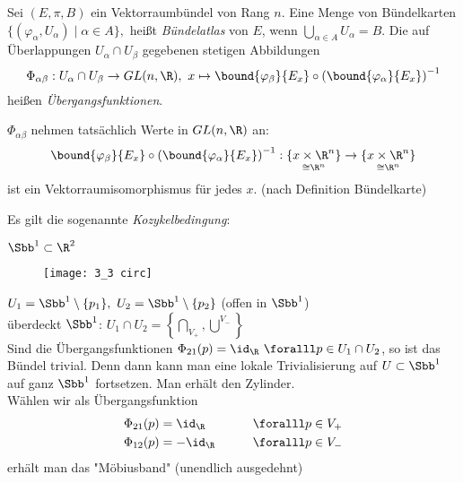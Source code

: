 \begin{defn} 
	Sei $ (E,\pi,B) $ ein Vektorraumbündel von Rang $n$. Eine Menge von Bündelkarten $ \{(\varphi_\alpha, U_\alpha) \mid \alpha \in A\}, $ heißt \emph{Bündelatlas} von $E$, wenn $ \bigcup_{\alpha \in A} U_\alpha = B. $
	Die auf Überlappungen $ U_\alpha \cap U_\beta $ gegebenen stetigen Abbildungen 
	$$ \Phi_{\alpha \beta}: U_\alpha \cap U_\beta \to GL(n,\R),\ x \mapsto \bound{\varphi_\beta}{E_x} \circ \left( \bound{\varphi_\alpha}{E_x} \right)^{-1} $$
	heißen \emph{Übergangsfunktionen}.
\end{defn}

\begin{rem*}
	$\Phi_{\alpha \beta}$ nehmen tatsächlich Werte in $GL(n,\R)$ an:
	$$ \bound{\varphi_\beta}{E_x} \circ \left( \bound{\varphi_\alpha}{E_x} \right)^{-1}: \underset{\cong \R^n}{\{x \times \R^n\}} \to \underset{\cong \R^n}{\{x \times \R^n\}} $$
	ist ein Vektorraumisomorphismus für jedes $x$. (nach Definition Bündelkarte)
\end{rem*}

\begin{rem*}
	Es gilt die sogenannte \emph{Kozykelbedingung}:
\end{rem*}

\begin{exmp*}
	$ \Sbb^1 \subset \R^2 $\\
	\begin{minipage}{\linewidth}
		\begin{wrapfigure}{R}{4cm}
			\centering
			\texttt{[image: 3\_3 circ]}
		\end{wrapfigure}
		$ U_1 = \Sbb^1 \setminus \{p_1\},\ U_2 = \Sbb^1 \setminus \{p_2\} $ (offen in $\Sbb^1$)\\
		überdeckt $\Sbb^1$: $ U_1 \cap U_2 = \left\{ \underset{V_+}{\bigcap}, \overset{V_-}{\bigcup} \right\} $\\
		Sind die Übergangsfunktionen $ \Phi_{21}(p) = \id_\R\ \foralll p \in U_1 \cap U_2 $, so ist das Bündel trivial. Denn dann kann man eine lokale Trivialisierung auf $ U \subset \Sbb^1 $ auf ganz $\Sbb^1$ fortsetzen. Man erhält den Zylinder.\\
		Wählen wir als Übergangsfunktion
		\begin{alignat*}{2}
			\Phi_{21}(p) &= \id_\R \qquad &&\foralll p \in V_+\\
			\Phi_{12}(p) &= -\id_\R \qquad &&\foralll p \in V_-
		\end{alignat*}
		erhält man das "Möbiusband" (unendlich ausgedehnt)
	\end{minipage}
\end{exmp*}


